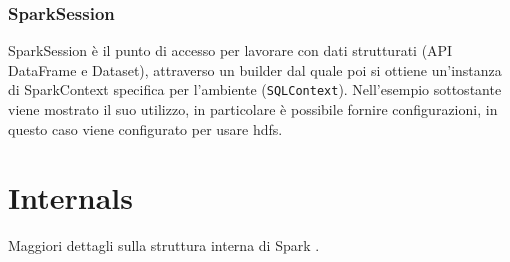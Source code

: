\documentclass[12pt,italian]{article}
\begin{document}
\subsubsection{SparkSession}\label{sec:SparkSession} 
SparkSession è il punto di accesso per lavorare con dati strutturati (API DataFrame e Dataset), attraverso un builder dal quale poi si ottiene un'instanza di SparkContext specifica per l'ambiente (\texttt{SQLContext}). 
Nell'esempio sottostante viene mostrato il suo utilizzo, in particolare è possibile fornire configurazioni, in questo caso viene configurato per usare hdfs.

\section{Internals}
Maggiori dettagli sulla struttura interna di Spark \cite{internals}.
\end{document}
